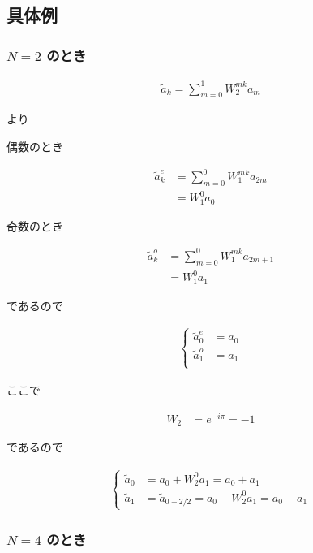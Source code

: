 \subsection{具体例}

\subsubsection{$N = 2$ のとき}

\begin{align}
    \tilde{a}_k = \sum_{m = 0}^1 W_2^{mk} a_m
\end{align}

より

偶数のとき

\begin{align*}
    \tilde{a}_k^{e} &= \sum_{m = 0}^0 W_1^{mk} a_{2m} \\
                    &= W_1^0 a_0
\end{align*}

奇数のとき

\begin{align*}
    \tilde{a}_{k}^{o} &= \sum_{m = 0}^0 W_1^{mk} a_{2m + 1} \\
                    &= W_1^0 a_1
\end{align*}

であるので

\begin{align}
    \begin{cases}
        \tilde{a}_0^{e} &= a_0 \\
        \tilde{a}_1^{o} &= a_1 \\
    \end{cases}
\end{align}

ここで

\begin{align*}
    W_2 &= e^{-i\pi} = -1
\end{align*}

であるので

\begin{align}
    \begin{cases}
        \tilde{a}_0 &= a_0 + W_2^0 a_1 = a_0 + a_1 \\
        \tilde{a}_1 &= \tilde{a}_{0 + 2/2} = a_0 - W_2^0 a_1 = a_0 - a_1
    \end{cases}
\end{align}

\subsubsection{$N = 4$ のとき}

